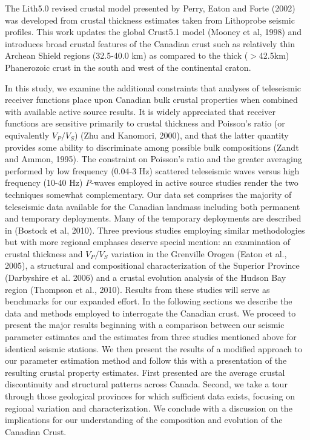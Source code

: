 \documentclass[review]{elsarticle}
\begin{document}
The Lith5.0 revised crustal model presented by Perry, Eaton and Forte (2002) was developed from crustal thickness estimates taken from Lithoprobe seismic profiles. This work updates the global Crust5.1 model (Mooney et al, 1998) and introduces broad crustal features of the Canadian crust such as relatively thin Archean Shield regions (32.5-40.0 km) as compared to the thick ($>$42.5km) Phanerozoic crust in the south and west of the continental craton.

In this study, we examine the additional constraints that analyses of teleseismic receiver functions place upon Canadian bulk crustal properties when combined with available active source results. It is widely appreciated that receiver functions are sensitive primarily to crustal thickness and Poisson's ratio (or equivalently $V_P/V_S$) (Zhu and Kanomori, 2000), and that the latter quantity provides some ability to discriminate among possible bulk compositions (Zandt and Ammon, 1995). The constraint on Poisson's ratio and the greater averaging performed by low frequency (0.04-3 Hz) scattered teleseismic waves versus high frequency (10-40 Hz) {\it P}-waves employed in active source studies render the two techniques somewhat complementary. Our data set comprises the majority of teleseismic data available for the Canadian landmass including both permanent and temporary deployments. Many of the temporary deployments are described in (Bostock et al, 2010). Three previous studies employing similar methodologies but with more regional emphases deserve special mention: an examination of crustal thickness and $V_P/V_S$ variation in the Grenville Orogen (Eaton et al., 2005), a structural and compositional characterization of the Superior Province (Darbyshire et al. 2006) and a crustal evolution analysis of the Hudson Bay region (Thompson et al., 2010). Results from these studies will serve as benchmarks for our expanded effort. In the following sections we describe the data and methods employed to interrogate the Canadian crust. We proceed to present the major results beginning with a comparison between our seismic parameter estimates and the estimates from three studies mentioned above for identical seismic stations. We then present the results of a modified approach to our parameter estimation method and follow this with a presentation of the resulting crustal property estimates.  First presented are the average crustal discontinuity and structural patterns across Canada. Second, we take a tour through those geological provinces for which sufficient data exists, focusing on regional variation and characterization. We conclude with a discussion on the implications for our understanding of the composition and evolution of the Canadian Crust.
\end{document}
